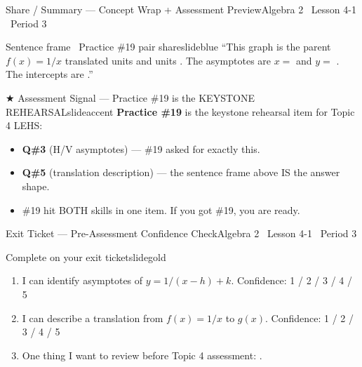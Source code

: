 \documentclass[aspectratio=169, 11pt]{beamer}
\begin{document}
\begin{frame}{Share / Summary --- Concept Wrap + Assessment Preview}{Algebra 2 \textperiodcentered\ Lesson 4-1 \textperiodcentered\ Period 3}
\vspace{0.1cm}
\begin{projcard}{Sentence frame \textperiodcentered\ Practice \#19 pair share}{slideblue}
\small
``This graph is the parent \(f(x) = 1/x\) translated \underline{\hspace{0.8cm}} units \underline{\hspace{0.8cm}} and \underline{\hspace{0.8cm}} units \underline{\hspace{0.8cm}}.
The asymptotes are \(x =\) \underline{\hspace{0.5cm}} and \(y =\) \underline{\hspace{0.5cm}}.
The intercepts are \underline{\hspace{1.8cm}}.''
\end{projcard}

\vspace{-0.1cm}
\begin{projcard}{\(\bigstar\) Assessment Signal --- Practice \#19 is the KEYSTONE REHEARSAL}{slideaccent}
\small
\textbf{Practice \#19} is the keystone rehearsal item for Topic 4 LEHS:
\begin{itemize}
  \setlength{\itemsep}{0pt}
  \item \textbf{Q\#3} (H/V asymptotes) --- \#19 asked for exactly this.
  \item \textbf{Q\#5} (translation description) --- the sentence frame above IS the answer shape.
  \item \#19 hit BOTH skills in one item. If you got \#19, you are ready.
\end{itemize}
\end{projcard}
\end{frame}

\begin{frame}{Exit Ticket --- Pre-Assessment Confidence Check}{Algebra 2 \textperiodcentered\ Lesson 4-1 \textperiodcentered\ Period 3}
\vspace{0.2cm}
\begin{projcard}{Complete on your exit ticket}{slidegold}
\begin{enumerate}
  \setlength{\itemsep}{0.2cm}
  \item I can identify asymptotes of \(y = 1/(x-h) + k\). \hfill Confidence: 1 / 2 / 3 / 4 / 5
  \item I can describe a translation from \(f(x) = 1/x\) to \(g(x)\). \hfill Confidence: 1 / 2 / 3 / 4 / 5
  \item One thing I want to review before Topic 4 assessment: \underline{\hspace{3.5cm}}.
\end{enumerate}
\end{projcard}
\end{frame}
\end{document}

